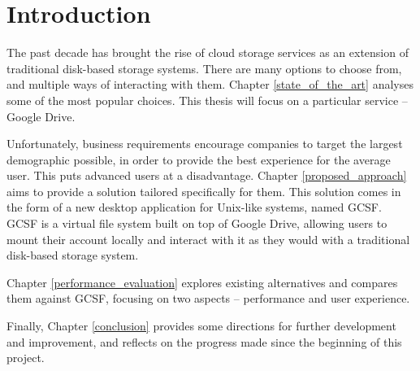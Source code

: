 \chapter{Introduction}

The past decade has brought the rise of cloud storage services as an extension of traditional disk-based storage systems. There are many options to choose from, and multiple ways of interacting with them. Chapter \ref{state_of_the_art}  analyses some of the most popular choices. This thesis will focus on a particular service -- Google Drive.

Unfortunately, business requirements encourage companies to target the largest demographic possible, in order to provide the best experience for the average user. This puts advanced users at a disadvantage. Chapter \ref{proposed_approach} aims to provide a solution tailored specifically for them. This solution comes in the form of a new desktop application for Unix-like systems, named GCSF. GCSF is a virtual file system built on top of Google Drive, allowing users to mount their account locally and interact with it as they would with a traditional disk-based storage system.

Chapter \ref{performance_evaluation} explores existing alternatives and compares them against GCSF, focusing on two aspects -- performance and user experience.

Finally, Chapter \ref{conclusion} provides some directions for further development and improvement, and reflects on the progress made since the beginning of this project.
